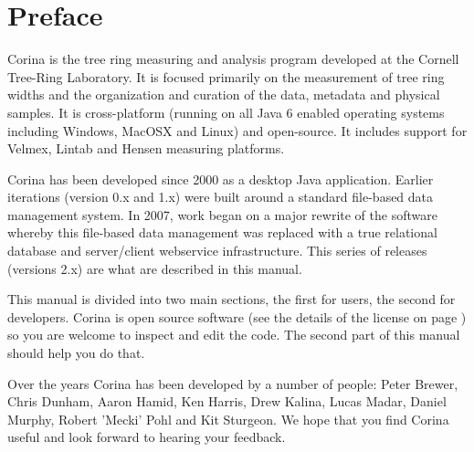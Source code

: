 \tableofcontents


\cleardoublepage
{} 

\section*{Preface}
\thispagestyle{empty} 

Corina is the tree ring measuring and analysis program developed at the Cornell Tree-Ring Laboratory. It is focused primarily on the measurement of tree ring widths and the organization and curation of the data, metadata and physical samples. It is cross-platform (running on all Java 6 enabled operating systems including Windows, MacOSX and Linux) and open-source. It includes support for Velmex, Lintab and Hensen measuring platforms.

Corina has been developed since 2000 as a desktop Java application. Earlier iterations (version 0.x and 1.x) were built around a standard file-based data management system. In 2007, work began on a major rewrite of the software whereby this file-based data management was replaced with a true relational database and server/client webservice infrastructure. This series of releases (versions 2.x) are what are described in this manual.

This manual is divided into two main sections, the first for users, the second for developers.  Corina is open source software (see the details of the license on page \pageref{txt:license}) so you are welcome to inspect and edit the code.  The second part of this manual should help you do that.

Over the years Corina has been developed by a number of people: Peter Brewer, Chris Dunham, Aaron Hamid, Ken Harris, Drew Kalina, Lucas Madar, Daniel Murphy, Robert 'Mecki' Pohl and Kit Sturgeon.  We hope that you find Corina useful and look forward to hearing your feedback.



